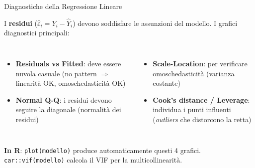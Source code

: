 \documentclass[
  ignorenonframetext,
]{beamer}
\begin{document}
\begin{frame}{Diagnostiche della Regressione Lineare}
\label{diagnostiche-della-regressione-lineare}

\small

I \textbf{residui} (\(\hat{\varepsilon}_i = Y_i - \hat{Y}_i\)) devono
soddisfare le assunzioni del modello. I grafici diagnostici principali:

\vspace{0.3em}

\begin{columns}
\begin{itemize}\footnotesize
\item \textbf{Residuals vs Fitted}: deve essere nuvola casuale (no pattern $\Rightarrow$ linearità OK, omoschedasticità OK)
\item \textbf{Normal Q-Q}: i residui devono seguire la diagonale (normalità dei residui)
\end{itemize}
\begin{itemize}\footnotesize
\item \textbf{Scale-Location}: per verificare omoschedasticità (varianza costante)
\item \textbf{Cook's distance / Leverage}: individua i punti influenti (\emph{outliers} che distorcono la retta)
\end{itemize}
\end{columns}

\vspace{0.4em}

\small \textbf{In R}: \texttt{plot(modello)} produce automaticamente
questi 4 grafici. \texttt{car::vif(modello)} calcola il VIF per la
multicollinearità.
\end{frame}
\end{document}
